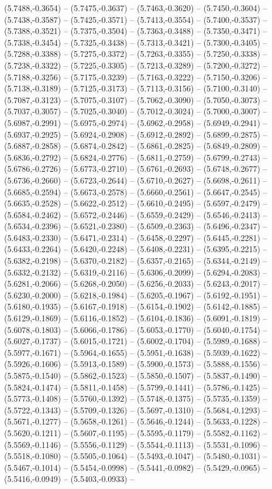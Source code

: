 (5.7488,-0.3654) -- (5.7475,-0.3637) -- (5.7463,-0.3620) -- (5.7450,-0.3604) -- (5.7438,-0.3587) -- (5.7425,-0.3571) -- (5.7413,-0.3554) -- (5.7400,-0.3537) -- (5.7388,-0.3521) -- (5.7375,-0.3504) -- (5.7363,-0.3488) -- (5.7350,-0.3471) -- (5.7338,-0.3454) -- (5.7325,-0.3438) -- (5.7313,-0.3421) -- (5.7300,-0.3405) -- (5.7288,-0.3388) -- (5.7275,-0.3372) -- (5.7263,-0.3355) -- (5.7250,-0.3338) -- (5.7238,-0.3322) -- (5.7225,-0.3305) -- (5.7213,-0.3289) -- (5.7200,-0.3272) -- (5.7188,-0.3256) -- (5.7175,-0.3239) -- (5.7163,-0.3222) -- (5.7150,-0.3206) -- (5.7138,-0.3189) -- (5.7125,-0.3173) -- (5.7113,-0.3156) -- (5.7100,-0.3140) -- (5.7087,-0.3123) -- (5.7075,-0.3107) -- (5.7062,-0.3090) -- (5.7050,-0.3073) -- (5.7037,-0.3057) -- (5.7025,-0.3040) -- (5.7012,-0.3024) -- (5.7000,-0.3007) -- (5.6987,-0.2991) -- (5.6975,-0.2974) -- (5.6962,-0.2958) -- (5.6949,-0.2941) -- (5.6937,-0.2925) -- (5.6924,-0.2908) -- (5.6912,-0.2892) -- (5.6899,-0.2875) -- (5.6887,-0.2858) -- (5.6874,-0.2842) -- (5.6861,-0.2825) -- (5.6849,-0.2809) -- (5.6836,-0.2792) -- (5.6824,-0.2776) -- (5.6811,-0.2759) -- (5.6799,-0.2743) -- (5.6786,-0.2726) -- (5.6773,-0.2710) -- (5.6761,-0.2693) -- (5.6748,-0.2677) -- (5.6736,-0.2660) -- (5.6723,-0.2644) -- (5.6710,-0.2627) -- (5.6698,-0.2611) -- (5.6685,-0.2594) -- (5.6673,-0.2578) -- (5.6660,-0.2561) -- (5.6647,-0.2545) -- (5.6635,-0.2528) -- (5.6622,-0.2512) -- (5.6610,-0.2495) -- (5.6597,-0.2479) -- (5.6584,-0.2462) -- (5.6572,-0.2446) -- (5.6559,-0.2429) -- (5.6546,-0.2413) -- (5.6534,-0.2396) -- (5.6521,-0.2380) -- (5.6509,-0.2363) -- (5.6496,-0.2347) -- (5.6483,-0.2330) -- (5.6471,-0.2314) -- (5.6458,-0.2297) -- (5.6445,-0.2281) -- (5.6433,-0.2264) -- (5.6420,-0.2248) -- (5.6408,-0.2231) -- (5.6395,-0.2215) -- (5.6382,-0.2198) -- (5.6370,-0.2182) -- (5.6357,-0.2165) -- (5.6344,-0.2149) -- (5.6332,-0.2132) -- (5.6319,-0.2116) -- (5.6306,-0.2099) -- (5.6294,-0.2083) -- (5.6281,-0.2066) -- (5.6268,-0.2050) -- (5.6256,-0.2033) -- (5.6243,-0.2017) -- (5.6230,-0.2000) -- (5.6218,-0.1984) -- (5.6205,-0.1967) -- (5.6192,-0.1951) -- (5.6180,-0.1935) -- (5.6167,-0.1918) -- (5.6154,-0.1902) -- (5.6142,-0.1885) -- (5.6129,-0.1869) -- (5.6116,-0.1852) -- (5.6104,-0.1836) -- (5.6091,-0.1819) -- (5.6078,-0.1803) -- (5.6066,-0.1786) -- (5.6053,-0.1770) -- (5.6040,-0.1754) -- (5.6027,-0.1737) -- (5.6015,-0.1721) -- (5.6002,-0.1704) -- (5.5989,-0.1688) -- (5.5977,-0.1671) -- (5.5964,-0.1655) -- (5.5951,-0.1638) -- (5.5939,-0.1622) -- (5.5926,-0.1606) -- (5.5913,-0.1589) -- (5.5900,-0.1573) -- (5.5888,-0.1556) -- (5.5875,-0.1540) -- (5.5862,-0.1523) -- (5.5850,-0.1507) -- (5.5837,-0.1490) -- (5.5824,-0.1474) -- (5.5811,-0.1458) -- (5.5799,-0.1441) -- (5.5786,-0.1425) -- (5.5773,-0.1408) -- (5.5760,-0.1392) -- (5.5748,-0.1375) -- (5.5735,-0.1359) -- (5.5722,-0.1343) -- (5.5709,-0.1326) -- (5.5697,-0.1310) -- (5.5684,-0.1293) -- (5.5671,-0.1277) -- (5.5658,-0.1261) -- (5.5646,-0.1244) -- (5.5633,-0.1228) -- (5.5620,-0.1211) -- (5.5607,-0.1195) -- (5.5595,-0.1179) -- (5.5582,-0.1162) -- (5.5569,-0.1146) -- (5.5556,-0.1129) -- (5.5544,-0.1113) -- (5.5531,-0.1096) -- (5.5518,-0.1080) -- (5.5505,-0.1064) -- (5.5493,-0.1047) -- (5.5480,-0.1031) -- (5.5467,-0.1014) -- (5.5454,-0.0998) -- (5.5441,-0.0982) -- (5.5429,-0.0965) -- (5.5416,-0.0949) -- (5.5403,-0.0933) -- 